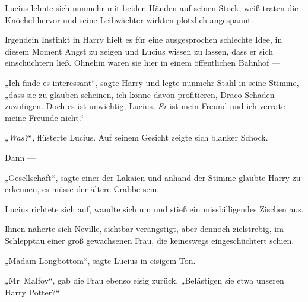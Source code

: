 Lucius lehnte sich nunmehr mit beiden Händen auf seinen Stock; weiß traten die Knöchel hervor und seine Leibwächter wirkten plötzlich angespannt.

Irgendein Instinkt in Harry hielt es für eine ausgesprochen schlechte Idee, in diesem Moment Angst zu zeigen und Lucius wissen zu lassen, dass er sich einschüchtern ließ. Ohnehin waren sie hier in einem öffentlichen Bahnhof —

„Ich finde es interessant“, sagte Harry und legte nunmehr Stahl in seine Stimme, „dass sie zu glauben scheinen, ich könne davon profitieren, Draco Schaden zuzufügen. Doch es ist unwichtig, Lucius. \emph{Er} ist mein Freund und ich verrate meine Freunde nicht.“

„\emph{Was?}“, flüsterte Lucius. Auf seinem Gesicht zeigte sich blanker Schock.

Dann —

„Gesellschaft“, sagte einer der Lakaien und anhand der Stimme glaubte Harry zu erkennen, es müsse der ältere Crabbe sein.

Lucius richtete sich auf, wandte sich um und stieß ein missbilligendes Zischen aus.

Ihnen näherte sich Neville, sichtbar verängstigt, aber dennoch zielstrebig, im Schlepptau einer groß gewachsenen Frau, die keineswegs eingeschüchtert schien.

„Madam Longbottom“, sagte Lucius in eisigem Ton.

„Mr~Malfoy“, gab die Frau ebenso eisig zurück.
„Belästigen sie etwa unseren Harry Potter?“

